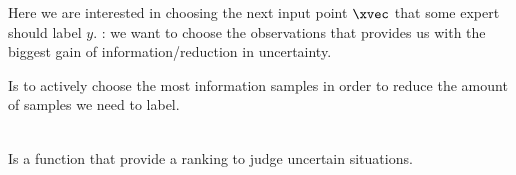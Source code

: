 \begin{sectionbox}\nospacing
  Here we are interested in choosing the next input point $\xvec$
  that some expert should label $y$.
  : we want to choose the observations that provides us with the biggest gain of information/reduction in uncertainty.
\end{sectionbox}
\begin{defnbox}\nospacing
  \begin{defn}\label{defn:active_learning}
    Is to actively choose the most information samples in order to reduce the
    amount of samples we need to label.
  \end{defn}
\end{defnbox}
\begin{defnbox}\nospacing
  \begin{defn}\label{defn:utility_function}\leavevmode\\
    Is a function that provide a ranking to judge uncertain situations.
  \end{defn}
\end{defnbox}

